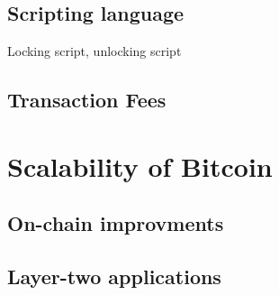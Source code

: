 
\subsection{Scripting language}
Locking script, unlocking script
\subsection{Transaction Fees}

\section{Scalability of Bitcoin}


\subsection{On-chain improvments}
\subsection{Layer-two applications}
